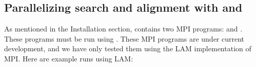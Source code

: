 

%


\subsection{Parallelizing search and alignment with 
  and }
As mentioned in the Installation section,  contains
two MPI programs:  and .
These programs must be run using . These MPI programs are
under current development, and we have only tested them using the LAM
implementation of MPI. Here are example runs using LAM:  



